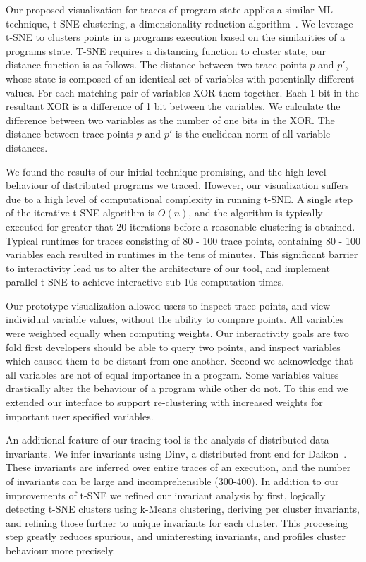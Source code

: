 Our proposed visualization for traces of program state applies a
similar ML technique, t-SNE clustering, a dimensionality reduction
algorithm~\cite{Hinton_visualizingdata}. We leverage t-SNE to clusters
points in a programs execution based on the similarities of a programs
state.  T-SNE requires a distancing function to cluster state, our
distance function is as follows. The distance between two trace points
$p$ and $p'$, whose state is composed of an identical set of variables
with potentially different values. For each matching pair of variables
XOR them together. Each 1 bit in the resultant XOR is a difference of
1 bit between the variables. We calculate the difference between two
variables as the number of one bits in the XOR. The distance between
trace points $p$ and $p'$ is the euclidean norm of all variable
distances.

We found the results of our initial technique promising, and the high level
behaviour of distributed programs we traced. However, our visualization suffers
due to a high level of computational complexity in running t-SNE. A single step
of the iterative t-SNE algorithm is $O(n)$, and the algorithm is typically
executed for greater that 20 iterations before a reasonable clustering is
obtained. Typical runtimes for traces consisting of 80 - 100 trace points,
containing 80 - 100 variables each resulted in runtimes in the tens of minutes.
This significant barrier to interactivity lead us to alter the architecture of
our tool, and implement parallel t-SNE to achieve interactive sub 10s
computation times. 

Our prototype visualization allowed users to inspect trace points, and
view individual variable values, without the ability to compare
points. All variables were weighted equally when computing weights.
Our interactivity goals are two fold first developers should be able
to query two points, and inspect variables which caused them to be
distant from one another. Second we acknowledge that all variables are
not of equal importance in a program. Some variables values
drastically alter the behaviour of a program while other do not. To
this end we extended our interface to support re-clustering with
increased weights for important user specified variables.

An additional feature of our tracing tool is the analysis of
distributed data invariants. We infer invariants using Dinv, a
distributed front end for Daikon~\cite{Ernst99dynamicallydiscovering}.
These invariants are inferred over entire traces of an execution, and
the number of invariants can be large and incomprehensible (300-400).
In addition to our improvements of t-SNE we refined our invariant
analysis by first, logically detecting t-SNE clusters using k-Means
clustering, deriving per cluster invariants, and refining those
further to unique invariants for each cluster. This processing step
greatly reduces spurious, and uninteresting invariants, and profiles
cluster behaviour more precisely.

